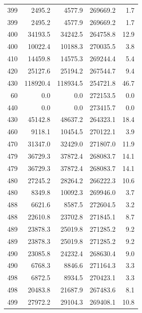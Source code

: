 \begin{longtable}{rrrrr}
    399 & \num{2495.2} & \num{4577.9} & \num{269669.2} & 1.7 \\
    399 & \num{2495.2} & \num{4577.9} & \num{269669.2} & 1.7 \\
    400 & \num{34193.5} & \num{34242.5} & \num{264758.8} & 12.9 \\
    400 & \num{10022.4} & \num{10188.3} & \num{270035.5} & 3.8 \\
    410 & \num{14459.8} & \num{14575.3} & \num{269244.4} & 5.4 \\
    420 & \num{25127.6} & \num{25194.2} & \num{267544.7} & 9.4 \\
    430 & \num{118920.4} & \num{118934.5} & \num{254721.8} & 46.7 \\
    60 & \num{0.0} & \num{0.0} & \num{272153.5} & 0.0 \\
    440 & \num{0.0} & \num{0.0} & \num{273415.7} & 0.0 \\
    430 & \num{45142.8} & \num{48637.2} & \num{264323.1} & 18.4 \\
    460 & \num{9118.1} & \num{10454.5} & \num{270122.1} & 3.9 \\
    470 & \num{31347.0} & \num{32429.0} & \num{271807.0} & 11.9 \\
    479 & \num{36729.3} & \num{37872.4} & \num{268083.7} & 14.1 \\
    479 & \num{36729.3} & \num{37872.4} & \num{268083.7} & 14.1 \\
    480 & \num{27245.2} & \num{28264.2} & \num{266222.3} & 10.6 \\
    480 & \num{8349.8} & \num{10092.3} & \num{269946.0} & 3.7 \\
    488 & \num{6621.6} & \num{8587.5} & \num{272604.5} & 3.2 \\
    488 & \num{22610.8} & \num{23702.8} & \num{271845.1} & 8.7 \\
    489 & \num{23878.3} & \num{25019.8} & \num{271285.2} & 9.2 \\
    489 & \num{23878.3} & \num{25019.8} & \num{271285.2} & 9.2 \\
    490 & \num{23085.8} & \num{24232.4} & \num{268630.4} & 9.0 \\
    490 & \num{6768.3} & \num{8846.6} & \num{271164.3} & 3.3 \\
    498 & \num{6872.5} & \num{8934.5} & \num{270423.1} & 3.3 \\
    498 & \num{20483.8} & \num{21687.9} & \num{267483.6} & 8.1 \\
    499 & \num{27972.2} & \num{29104.3} & \num{269408.1} & 10.8 \\

\end{longtable}
